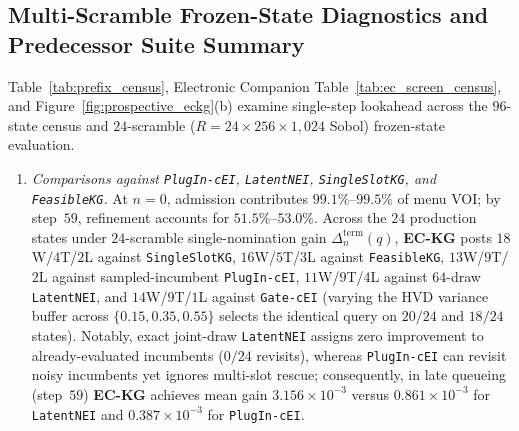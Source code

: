\begin{enumerate}
\end{enumerate}




\subsection{Multi-Scramble Frozen-State Diagnostics and Predecessor Suite Summary}\label{sec:eligible_queries}\label{sec:broad_results}

Table~\ref{tab:prefix_census}, Electronic Companion Table~\ref*{tab:ec_screen_census}, and Figure~\ref{fig:prospective_eckg}(b) examine single-step lookahead across the $96$-state census and $24$-scramble ($R=24\times 256\times 1{,}024$ Sobol) frozen-state evaluation.
\begin{enumerate}
  \item \emph{Comparisons against \texttt{PlugIn-cEI}, \texttt{LatentNEI}, \texttt{SingleSlotKG}, and \texttt{FeasibleKG}.} At $n=0$, admission contributes $99.1\%$--$99.5\%$ of menu VOI; by step~$59$, refinement accounts for $51.5\%$--$53.0\%$. Across the $24$ production states under $24$-scramble single-nomination gain $\Delta_n^{\mathrm{term}}(q)$, \textbf{EC-KG} posts $18$W/$4$T/$2$L against \texttt{SingleSlotKG}, $16$W/$5$T/$3$L against \texttt{FeasibleKG}, $13$W/$9$T/$2$L against sampled-incumbent \texttt{PlugIn-cEI}, $11$W/$9$T/$4$L against $64$-draw \texttt{LatentNEI}, and $14$W/$9$T/$1$L against \texttt{Gate-cEI} (varying the HVD variance buffer across $\{0.15, 0.35, 0.55\}$ selects the identical query on $20/24$ and $18/24$ states). Notably, exact joint-draw \texttt{LatentNEI} assigns zero improvement to already-evaluated incumbents ($0/24$ revisits), whereas \texttt{PlugIn-cEI} can revisit noisy incumbents yet ignores multi-slot rescue; consequently, in late queueing (step~$59$) \textbf{EC-KG} achieves mean gain $3.156\times 10^{-3}$ versus $0.861\times 10^{-3}$ for \texttt{LatentNEI} and $0.387\times 10^{-3}$ for \texttt{PlugIn-cEI}.

\end{enumerate}
